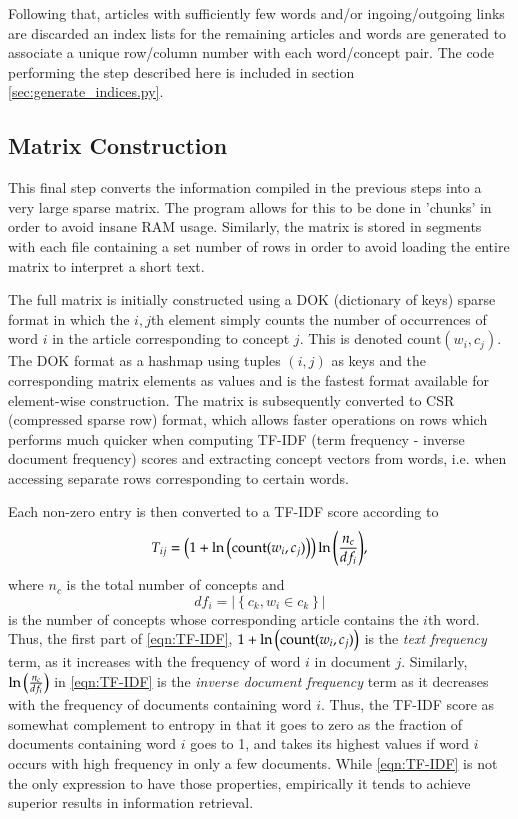 Following that, articles with sufficiently few words and/or in\-going/\-out\-going links are discarded an index lists for the remaining articles and words are generated to associate a unique row/column number with each word/concept pair. The code performing the step described here is included in section \ref{sec:generate_indices.py}.

\subsection{Matrix Construction}
\label{sec:matrix_building}
This final step converts the information compiled in the previous steps into a very large sparse matrix. The program allows for this to be done in 'chunks' in order to avoid insane RAM usage. Similarly, the matrix is stored in segments with each file containing a set number of rows in order to avoid loading the entire matrix to interpret a short text.

The full matrix is initially constructed using a DOK (dictionary of keys) sparse format in which the $i,j$th element simply counts the number of occurrences of word $i$ in the article corresponding to concept $j$. This is denoted $\text{count}(w_i,c_j)$. The DOK format as a hashmap using tuples $(i,j)$ as keys and the corresponding matrix elements as values and is the fastest format available for element-wise construction. The matrix is subsequently converted to CSR (compressed sparse row) format, which allows faster operations on rows which performs much quicker when computing TF-IDF (term frequency - inverse document frequency) scores and extracting concept vectors from words, i.e. when accessing separate rows corresponding to certain words.

Each non-zero entry is then converted to a TF-IDF score according to
\begin{equation}
	T_{ij} = \left( 1 + \ln{\left( \text{count}(w_i, c_j) \right)} \right) \ln{\left( \frac{n_c}{df_i}  \right)}, \label{eqn:TF-IDF}
\end{equation}
where $n_c$ is the total number of concepts and
\begin{equation}
	df_i = \left| \left\{ c_k, w_i \in c_k \right\} \right|
\end{equation}
is the number of concepts whose corresponding  article  contains the  $i$th word. Thus, the first part of \eqref{eqn:TF-IDF}, $1 + \ln{\left( \text{count}(w_i, c_j) \right)}$ is the \textit{text frequency} term, as it increases with the frequency of word $i$ in document $j$. Similarly, $\ln{\left( \frac{n_c}{df_i}  \right)}$ in \eqref{eqn:TF-IDF} is the \textit{inverse document frequency} term as it decreases with the frequency of documents containing word $i$. Thus, the TF-IDF score as somewhat complement to entropy  in that it goes to zero as the fraction of documents containing word $i$ goes to 1, and takes its highest values if word $i$ occurs with high frequency in only a few documents\cite{Manning2009}. While \eqref{eqn:TF-IDF} is not the only expression to have those properties, empirically it tends to achieve superior results in information retrieval\cite{Salton1988}.

